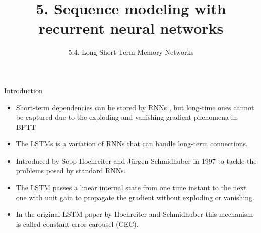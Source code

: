 \documentclass{beamer}
\title[5. Recurrent neural networks]{5. Sequence modeling with recurrent neural networks}
\subtitle{5.4. Long Short-Term Memory Networks}
\begin{document}
\maketitle

\begin{frame}{Introduction}
\begin{itemize} 

\item Short-term dependencies can be stored by RNNs , but long-time ones cannot be captured due to the exploding and vanishing gradient phenomena in BPTT 
\item The LSTMs  is a variation of RNNs that can handle long-term connections. 
\item Introduced by Sepp Hochreiter and J\"urgen Schmidhuber in 1997 to tackle the problems posed by standard RNNs.
\item The LSTM passes a linear  internal state from one time instant to the next one with unit gain to propagate the gradient without exploding or vanishing. 
\item In the original LSTM paper by Hochreiter and Schmidhuber this mechanism is called constant error carousel (CEC).  
\end{itemize}
\end{frame}
\end{document}
